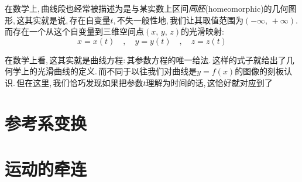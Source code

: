 在数学上,\,曲线段也经常被描述为是与某实数上区间\emph{同胚}(homeomorphic)的几何图形,\,这其实就是说,\,存在自变量$t$,\,不失一般性地,\,我们让其取值范围为$(-\infty,\,+\infty)$.\,而存在一个从这个自变量到三维空间点$(x,\,y,\,z)$的光滑映射:
\[x=x(t)\quad ,\quad y=y(t)\quad ,\quad z=z(t)\]

在数学上看,\,这其实就是曲线方程:\,其参数方程的唯一给法.\,这样的式子就给出了几何学上的光滑曲线的定义.\,而不同于以往我们对曲线是$y=f(x)$的图像的刻板认识.\,但在这里,\,我们恰巧发现如果把参数$t$理解为时间的话,\,这恰好就对应到了



\section{参考系变换}

\section{运动的牵连}

